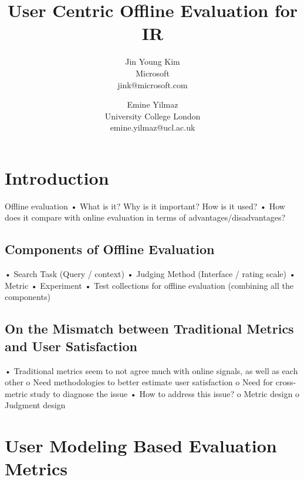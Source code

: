 \documentclass[openany]{now} %
\title{User Centric Offline Evaluation for IR}
\author{
Jin Young Kim \\
Microsoft \\
jink@microsoft.com
\and
Emine Yilmaz \\
University College London \\
emine.yilmaz@ucl.ac.uk
}
\begin{document}

\frontmatter  %

\maketitle

\tableofcontents

\mainmatter

\begin{abstract}

\end{abstract}

\chapter{Introduction}
\label{c-intro} %

Offline evaluation
•	What is it? Why is it important? How is it used? 
•	How does it compare with online evaluation in terms of advantages/disadvantages?

\section{Components of Offline Evaluation}

•	Search Task (Query / context)
•	Judging Method (Interface / rating scale) 
•	Metric
•	Experiment
•	Test collections for offline evaluation (combining all the components)

\section{On the Mismatch between Traditional Metrics and User Satisfaction}
•	Traditional metrics seem to not agree much with online signals, as well as each other
	o	Need methodologies to better estimate user satisfaction
	o	Need for cross-metric study to diagnose the issue
•	How to address this issue?
	o	Metric design
	o	Judgment design

\chapter{User Modeling Based Evaluation Metrics}
\end{document}
